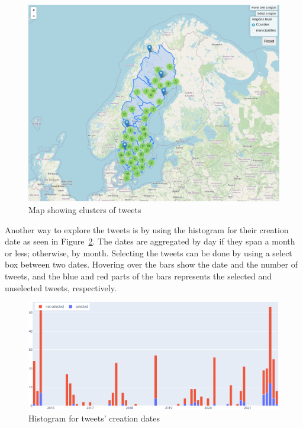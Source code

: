 \begin{figure}[H]
\begin{center}
  \includegraphics[width=\columnwidth]{./images/map.png}
\end{center}
\caption{Map showing clusters of tweets}
\label{fig:map}
\end{figure}


Another way to explore the tweets is by using the histogram for their creation date as seen in
Figure~\ref{fig:histogram}. The dates are aggregated by day if they span a month or less; otherwise, by month.
Selecting the tweets can be done by using a select box between two dates. Hovering over the bars
show the date and the number of tweets, and the blue and red parts of the bars represents the selected
and unselected tweets, respectively.

\begin{figure}[H]
\begin{center}
  \includegraphics[width=\columnwidth]{./images/histogram.png}
\end{center}
\caption{Histogram for tweets' creation dates}
\label{fig:histogram}
\end{figure}

